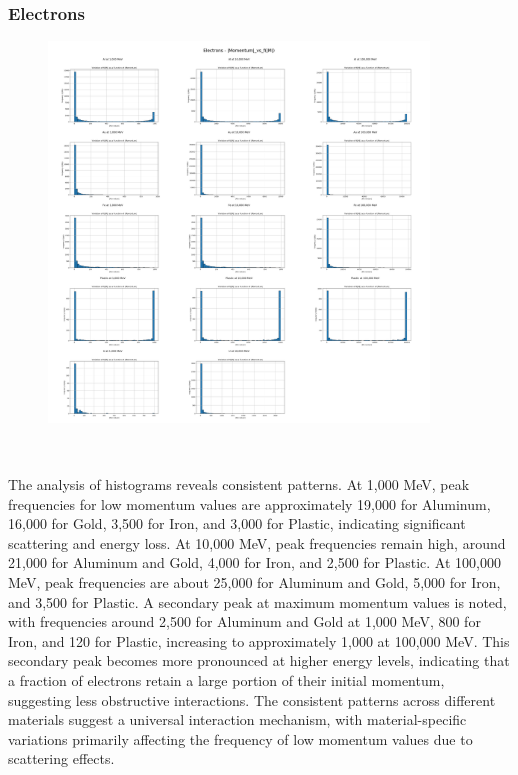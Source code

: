 \documentclass{article}
\begin{document}
\subsubsection{Electrons}

\begin{figure}[H]
\centering
\includegraphics[width=0.9\textwidth]{images/Combined Plots/|Momentum|_vs_f(|M|)_e-.png}
\end{figure}\

\noindent The analysis of histograms reveals consistent patterns. At 1,000 MeV, peak frequencies for low momentum values are approximately 19,000 for Aluminum, 16,000 for Gold, 3,500 for Iron, and 3,000 for Plastic, indicating significant scattering and energy loss. At 10,000 MeV, peak frequencies remain high, around 21,000 for Aluminum and Gold, 4,000 for Iron, and 2,500 for Plastic. At 100,000 MeV, peak frequencies are about 25,000 for Aluminum and Gold, 5,000 for Iron, and 3,500 for Plastic. A secondary peak at maximum momentum values is noted, with frequencies around 2,500 for Aluminum and Gold at 1,000 MeV, 800 for Iron, and 120 for Plastic, increasing to approximately 1,000 at 100,000 MeV. This secondary peak becomes more pronounced at higher energy levels, indicating that a fraction of electrons retain a large portion of their initial momentum, suggesting less obstructive interactions. The consistent patterns across different materials suggest a universal interaction mechanism, with material-specific variations primarily affecting the frequency of low momentum values due to scattering effects.
\end{document}
